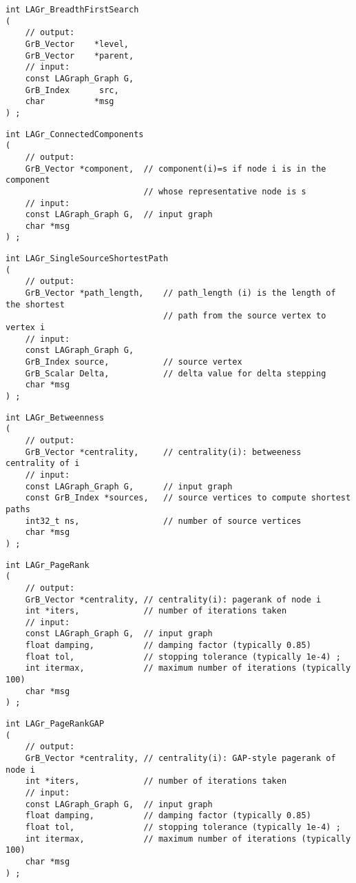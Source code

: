 \begin{verbatim}
int LAGr_BreadthFirstSearch
(
    // output:
    GrB_Vector    *level,
    GrB_Vector    *parent,
    // input:
    const LAGraph_Graph G,
    GrB_Index      src,
    char          *msg
) ;
\end{verbatim}




\begin{verbatim}
int LAGr_ConnectedComponents
(
    // output:
    GrB_Vector *component,  // component(i)=s if node i is in the component
                            // whose representative node is s
    // input:
    const LAGraph_Graph G,  // input graph
    char *msg
) ;
\end{verbatim}




\begin{verbatim}
int LAGr_SingleSourceShortestPath
(
    // output:
    GrB_Vector *path_length,    // path_length (i) is the length of the shortest
                                // path from the source vertex to vertex i
    // input:
    const LAGraph_Graph G,
    GrB_Index source,           // source vertex
    GrB_Scalar Delta,           // delta value for delta stepping
    char *msg
) ;
\end{verbatim}




\begin{verbatim}
int LAGr_Betweenness
(
    // output:
    GrB_Vector *centrality,     // centrality(i): betweeness centrality of i
    // input:
    const LAGraph_Graph G,      // input graph
    const GrB_Index *sources,   // source vertices to compute shortest paths
    int32_t ns,                 // number of source vertices
    char *msg
) ;
\end{verbatim}




\begin{verbatim}
int LAGr_PageRank
(
    // output:
    GrB_Vector *centrality, // centrality(i): pagerank of node i
    int *iters,             // number of iterations taken
    // input:
    const LAGraph_Graph G,  // input graph
    float damping,          // damping factor (typically 0.85)
    float tol,              // stopping tolerance (typically 1e-4) ;
    int itermax,            // maximum number of iterations (typically 100)
    char *msg
) ;
\end{verbatim}




\begin{verbatim}
int LAGr_PageRankGAP
(
    // output:
    GrB_Vector *centrality, // centrality(i): GAP-style pagerank of node i
    int *iters,             // number of iterations taken
    // input:
    const LAGraph_Graph G,  // input graph
    float damping,          // damping factor (typically 0.85)
    float tol,              // stopping tolerance (typically 1e-4) ;
    int itermax,            // maximum number of iterations (typically 100)
    char *msg
) ;
\end{verbatim}




